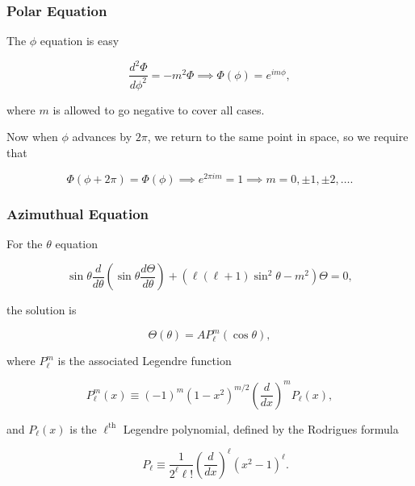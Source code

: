 \documentclass[a4paper,12pt]{report}
\begin{document}
\subsubsection{Polar Equation}

The \(\phi \) equation is easy 

\begin{equation}
  \frac{d^2\Phi }{d\phi ^2} = - m^2\Phi \implies \Phi (\phi ) = e^{im \phi },
\end{equation}

where \(m\) is allowed to go negative to cover all cases.

Now when \(\phi \) advances by \(2\pi \), we return to the same point in space, so we require that 

\begin{equation}
  \Phi (\phi +2\pi ) = \Phi (\phi ) \implies e^{2\pi im} = 1 \implies m = 0,\pm 1,\pm 2,\ldots . 
\end{equation}

\subsubsection{Azimuthual Equation}

For the \(\theta \) equation

\begin{equation}
  \sin \theta \frac{d}{d\theta } \left( \sin \theta \frac{d\Theta }{d \theta }  \right) + \left( \ell (\ell +1)\sin ^2\theta -m^2 \right) \Theta =0,
\end{equation}

the solution is 

\begin{equation}
  \Theta (\theta ) = A P_{\ell }^{m}(\cos \theta ),
\end{equation}

where \(P_{\ell }^{m}  \) is the associated Legendre function 

\begin{equation}
  P_{\ell }^{m}(x)\equiv (-1)^{m}(1-x^2)^{m /2} \left( \frac{d}{dx}  \right)^{m}P_{\ell }(x),
\end{equation}

and \(P_{\ell }(x) \) is the \(\ell^{\text{th}} \) Legendre polynomial, defined by the Rodrigues formula

\begin{equation}
  \quad P_{\ell } \equiv \frac{1}{2^{\ell }\ell ! } \left( \frac{d}{dx}  \right)^{\ell } \left( x^2-1 \right) ^{\ell }.
\end{equation}
\end{document}
